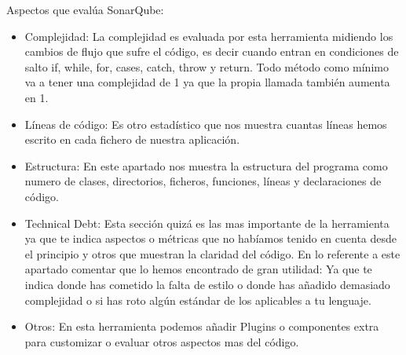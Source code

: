 Aspectos que evalúa SonarQube:
\begin{itemize}
	\item Complejidad: La complejidad es evaluada por esta herramienta midiendo los cambios de flujo que sufre el código, es decir cuando entran en condiciones de salto if, while, for, cases, catch, throw y return. Todo método como mínimo va a tener una complejidad de 1 ya que la propia llamada también aumenta en 1.
	\item Líneas de código: Es otro estadístico que nos muestra cuantas líneas hemos escrito en cada fichero de nuestra aplicación.
	\item Estructura: En este apartado nos muestra la estructura del programa como numero de clases, directorios, ficheros, funciones, líneas y declaraciones de código.
	\item Technical Debt: Esta sección quizá es las mas importante de la herramienta ya que te indica aspectos o métricas que no habíamos tenido en cuenta desde el principio y otros que muestran la claridad del código.
	En lo referente a este apartado comentar que lo hemos encontrado de gran utilidad: Ya que te indica donde has cometido la falta de estilo o donde has añadido demasiado complejidad o si has roto algún estándar de los aplicables a tu lenguaje.
	\item Otros: En esta herramienta podemos añadir Plugins o componentes extra para customizar o evaluar otros aspectos mas del código.
\end{itemize}